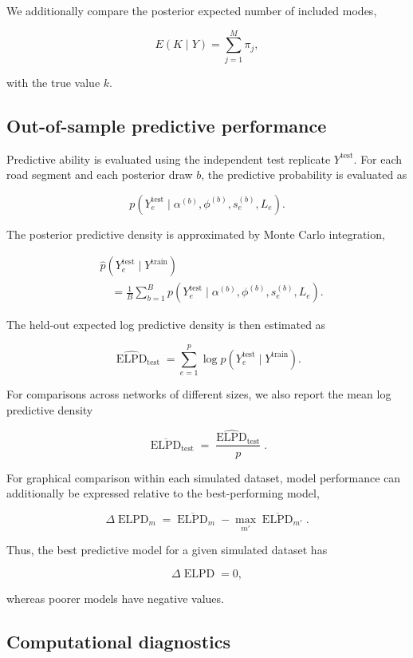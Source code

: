 \documentclass[11pt]{article}
\begin{document}
We additionally compare the posterior expected number of included modes,

\[
E(K\mid Y)
=
\sum_{j=1}^{M}\pi_j,
\]

with the true value $k$.

\subsection{Out-of-sample predictive performance}

Predictive ability is evaluated using the independent test replicate $Y^{\mathrm{test}}$. For each road segment and each posterior draw $b$, the predictive probability is evaluated as

\[
p
\left(
Y_e^{\mathrm{test}}
\mid
\alpha^{(b)},
\phi^{(b)},
s_e^{(b)},
L_e
\right).
\]

The posterior predictive density is approximated by Monte Carlo integration,

\[
\begin{aligned}
&\widehat p\left(Y_e^{\mathrm{test}}\mid Y^{\mathrm{train}}\right)\\
&\quad=\frac{1}{B}\sum_{b=1}^{B}p\left(Y_e^{\mathrm{test}}\mid
\alpha^{(b)},\phi^{(b)},s_e^{(b)},L_e\right).
\end{aligned}
\]

The held-out expected log predictive density is then estimated as

\[
\widehat{\operatorname{ELPD}}_{\mathrm{test}}
=
\sum_{e=1}^{p}
\log
\widehat p
\left(
Y_e^{\mathrm{test}}
\mid
Y^{\mathrm{train}}
\right).
\]

For comparisons across networks of different sizes, we also report the mean log predictive density

\[
\overline{\operatorname{ELPD}}_{\mathrm{test}}
=
\frac{
	\widehat{\operatorname{ELPD}}_{\mathrm{test}}
}{p}.
\]

For graphical comparison within each simulated dataset, model performance can additionally be expressed relative to the best-performing model,

\[
\Delta\operatorname{ELPD}_m
=
\overline{\operatorname{ELPD}}_m
-
\max_{m'}
\overline{\operatorname{ELPD}}_{m'}.
\]

Thus, the best predictive model for a given simulated dataset has

\[
\Delta\operatorname{ELPD}=0,
\]

whereas poorer models have negative values.

\subsection{Computational diagnostics}
\end{document}

